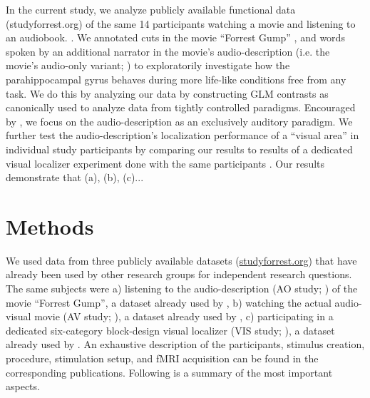 \documentclass[english]{article}
\begin{document}
In the current study, we analyze publicly available functional data
(studyforrest.org) of the same 14 participants watching a movie
\citep{hanke2016simultaneous} and listening to an audiobook.
\citep{hanke2014audiomovie}.
We annotated cuts  in the movie ``Forrest Gump'' \citep{ForrestGumpMovie}, and
words spoken by an additional narrator in the movie's audio-description (i.e.
the movie's audio-only variant; \citep{ForrestGumpGermanAD}) to exploratorily
investigate how the parahippocampal gyrus behaves during more life-like
conditions free from any task.
We do this by analyzing our data by constructing GLM contrasts as canonically
used to analyze data from tightly controlled paradigms.
Encouraged by \citep{aziz2008modulation}, we focus on the audio-description as
an exclusively auditory paradigm. We further test the audio-description's localization
performance of a ``visual area'' in individual study participants by comparing
our results to results of a dedicated visual localizer experiment done with the
same participants \citep{sengupta2016extension}.
Our results demonstrate that (a), (b), (c)... 



\section{Methods}


We used data from three publicly available datasets
(\href{http://www.studyforrest.org}{studyforrest.org}) that have already been
used by other research groups for independent research questions.
The same subjects were
a) listening to the audio-description (AO study; \citep{hanke2014audiomovie}) of
the movie ``Forrest Gump'', a dataset already used by \citep{hu2017decoding,
nguyen2016integration},
b) watching the actual audio-visual movie (AV study;
\citep{hanke2016simultaneous}), a dataset already used by
\citep{ben2018hippocampal},
c) participating in a dedicated six-category block-design visual localizer (VIS
study; \citep{sengupta2016extension}), a dataset already used by
\citep{jiahui2019predicting}.
An exhaustive description of the participants, stimulus creation, procedure,
stimulation setup, and fMRI acquisition can be found in the corresponding
publications. Following is a summary of the most important aspects.
\end{document}
